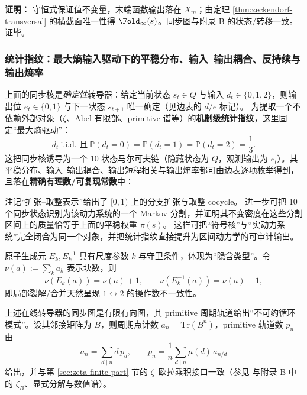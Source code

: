 \textbf{证明：}
守恒式保证值不变量，末端函数输出落在 $X_m$；由定理 \ref{thm:zeckendorf-transversal} 的横截面唯一性得 $\Fold_\infty(s)$。同步图与附录 B 的状态/转移一致。证毕。

\subsubsection{统计指纹：最大熵输入驱动下的平稳分布、输入--输出耦合、反持续与输出熵率}\label{subsec:sync10-stat-fingerprint}
上面的同步核是\emph{确定性}转导器：给定当前状态 $s_t\in Q$ 与输入 $d_t\in\{0,1,2\}$，则输出位 $e_t\in\{0,1\}$ 与下一状态 $s_{t+1}$ 唯一确定（见边表的 $d/e$ 标记）。
为提取一个不依赖外部对象（$\zeta$、Abel 有限部、primitive 谱等）的\textbf{机制级统计指纹}，这里固定“最大熵驱动”：
$$
d_t\ \text{i.i.d. 且}\ \mathbb P(d_t=0)=\mathbb P(d_t=1)=\mathbb P(d_t=2)=\frac{1}{3}.
$$
这把同步核诱导为一个 10 状态马尔可夫链（隐藏状态为 $Q$，观测输出为 $e_t$）。其平稳分布、输入--输出耦合、输出短程相关与输出熵率都可由边表逐项枚举得到，且落在\textbf{精确有理数/可复现常数}中：


\begin{remark}
注记“扩张--取整表示”给出了 $[0,1)$ 上的分支扩张与取整 cocycle。
进一步可把 10 个同步状态识别为该动力系统的一个 Markov 分割，并证明其不变密度在这些分割区间上的质量恰等于上面的平稳权重 $\pi(s)$。
这样可把“符号核”与“实动力系统”完全闭合为同一个对象，并把统计指纹直接提升为区间动力学的可审计输出。
\end{remark}

\begin{remark}[操作数不一致与隐含属性]
原子生成元 $E_k,E_k^{-1}$ 具有尺度参数 $k$ 与守卫条件，体现为“隐含类型”。令 $\nu(a):=\sum_k a_k$ 表示块数，则
\[
\nu(E_k(a))=\nu(a)+1,\qquad \nu(E_k^{-1}(a))=\nu(a)-1,
\]
即局部裂解/合并天然呈现 $1\leftrightarrow 2$ 的操作数不一致性。
\end{remark}

\begin{remark}\label{rem:primitive-shadow}
上述在线转导器的同步图是有限有向图，其 primitive 周期轨道给出“不可约循环模式”。设其邻接矩阵为 $B$，则周期点计数 $a_n=\mathrm{Tr}(B^n)$，primitive 轨道数 $p_n$ 由
\[
a_n=\sum_{d\mid n} d\,p_d,\qquad
p_n=\frac{1}{n}\sum_{d\mid n}\mu(d)\,a_{n/d}
\]
给出，并与第 \ref{sec:zeta-finite-part} 节的 $\zeta$--欧拉乘积接口一致（参见 \cite{LindMarcus1995} 与附录 B 中的 $\zeta_B$、显式分解与数值谱）。
\end{remark}

